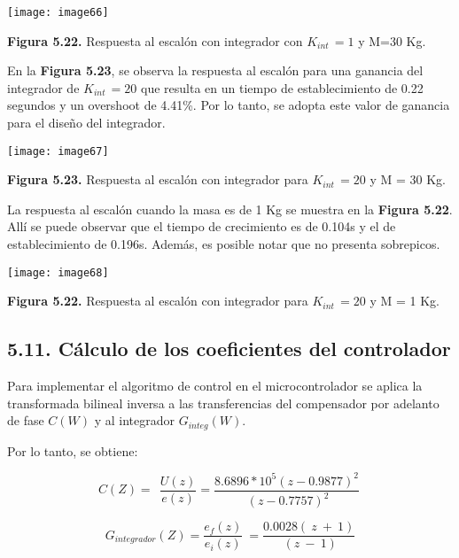 \documentclass{article} %
\begin{document}
\noindent 

\noindent \texttt{[image: image66]}

\noindent \textbf{Figura 5.22. }Respuesta al escal\'{o}n con integrador con $K_{int\ }=1$ y M=30 Kg.

\noindent 

\noindent En la \textbf{Figura 5.23}, se observa la respuesta al escal\'{o}n para una ganancia del integrador de $K_{int\ }=20$ que resulta en un tiempo de establecimiento de 0.22 segundos y un overshoot de 4.41\%. Por lo tanto, se adopta este valor de ganancia para el dise\~{n}o del integrador.

\noindent 

\noindent \texttt{[image: image67]}

\noindent \textbf{Figura 5.23. }Respuesta al escal\'{o}n con integrador para $K_{int\ }=20$ y M = 30 Kg.

\noindent 

\noindent La respuesta al escal\'{o}n cuando la masa es de 1 Kg se muestra en la \textbf{Figura 5.22}. All\'{i} se puede observar que el tiempo de crecimiento es de 0.104s y el de establecimiento de 0.196s. Adem\'{a}s, es posible notar que no presenta sobrepicos.

\noindent 

\noindent \texttt{[image: image68]}

\noindent \textbf{Figura 5.22. }Respuesta al escal\'{o}n con integrador para $K_{int\ }=20$ y M = 1 Kg.

\noindent 
\subsection{5.11.  C\'{a}lculo de los coeficientes del controlador}

\noindent Para implementar el algoritmo de control en el microcontrolador se aplica la transformada bilineal inversa a las transferencias del compensador por adelanto de fase $C(W)$ y al integrador $G_{integ}(W)$.\textbf{}

\noindent 

\noindent Por lo tanto, se obtiene:

\noindent 
\begin{equation} \label{GrindEQ__5_6_} 
C(Z)=\ \ \frac{U(z)}{e(z)}=\frac{8.6896*10^5(z-0.9877)^2}{\ (z-0.7757)^2}\  
\end{equation} 

\begin{equation} \label{GrindEQ__5_7_} 
G_{integrador}(Z)=\frac{e_f(z)}{e_i(z)}\ =\frac{0.0028(\ z\ +\ 1)}{\ (z\ -\ 1)} 
\end{equation} 
\end{document}
